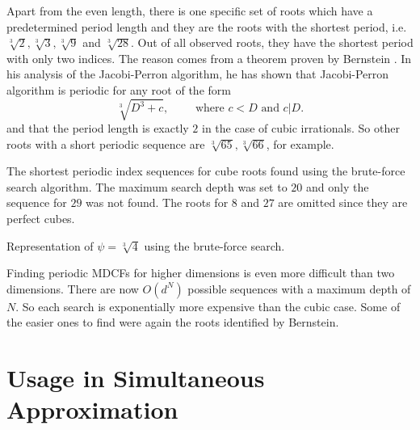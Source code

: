 Apart from the even length, there is one specific set of roots which have a
predetermined period length
and they are the roots with the shortest period, i.e. $\sqrt[3]{2},
\sqrt[3]{3}, \sqrt[3]{9}$ and $\sqrt[3]{28}$.
Out of all observed roots, they have the shortest period with only two indices.
The reason comes from a theorem proven by Bernstein \cite{Bernstein71}.
In his analysis of the Jacobi-Perron algorithm,
he has shown that Jacobi-Perron algorithm is periodic for any root of the form
\[
  \sqrt[3]{D^3 + c}, \qquad \text{ where } c < D \text{ and } c|D.
\]
and that the period length is exactly $2$ in the case of cubic irrationals.
So other roots with a short periodic sequence are $\sqrt[3]{65}, \sqrt[3]{66}$,
for example.

\begin{table}[tbp]
  \caption{
    The shortest periodic index sequences for cube roots found using the
    brute-force search algorithm. The maximum search depth was set to $20$ and
    only the sequence for $29$ was not found. The roots for $8$ and $27$ are
    omitted since they are perfect cubes.}
  \label{tbl:cubics}
  \centering
  
\end{table}

\begin{table}[tbp]
  \caption{Representation of $ψ = \sqrt[3]{4}$ using the brute-force search.}
  \label{table:cube-root-4}
  \centering
  \footnotesize
  
\end{table}

Finding periodic MDCFs for higher dimensions is even more difficult than two dimensions.
There are now $O(d^N)$ possible sequences with a maximum depth of $N$.
So each search is exponentially more expensive than the cubic case.
Some of the easier ones to find were again the roots identified by Bernstein.
\fi

\section{Usage in Simultaneous Approximation}

